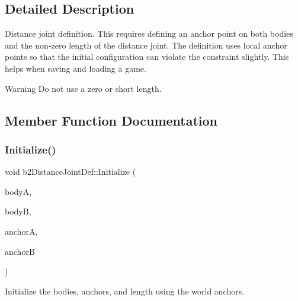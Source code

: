 \subsection{Detailed Description}
Distance joint definition. This requires defining an anchor point on both bodies and the non-\/zero length of the distance joint. The definition uses local anchor points so that the initial configuration can violate the constraint slightly. This helps when saving and loading a game. \begin{DoxyWarning}{Warning}
Do not use a zero or short length. 
\end{DoxyWarning}


\subsection{Member Function Documentation}
\mbox{\label{structb2DistanceJointDef_a99788a534638cc28cd1e44e0036503f0}} 
\subsubsection{\texorpdfstring{Initialize()}{Initialize()}\hspace{0.1cm}{\footnotesize\ttfamily [1/2]}}
{\footnotesize\ttfamily void b2\+Distance\+Joint\+Def\+::\+Initialize (\begin{DoxyParamCaption}\item[{\hyperlink{classb2Body}{b2\+Body} $\ast$}]{bodyA,  }\item[{\hyperlink{classb2Body}{b2\+Body} $\ast$}]{bodyB,  }\item[{const \hyperlink{structb2Vec2}{b2\+Vec2} \&}]{anchorA,  }\item[{const \hyperlink{structb2Vec2}{b2\+Vec2} \&}]{anchorB }\end{DoxyParamCaption})}

Initialize the bodies, anchors, and length using the world anchors. \mbox{\label{structb2DistanceJointDef_a99788a534638cc28cd1e44e0036503f0}} 
